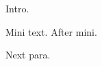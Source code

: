 \documentclass{article}\usepackage{amsthm}\newtheorem{thm}{Theorem}
\begin{document}
Intro.

{\minipage{3cm} Mini text.} After mini.

Next para.
\end{document}
